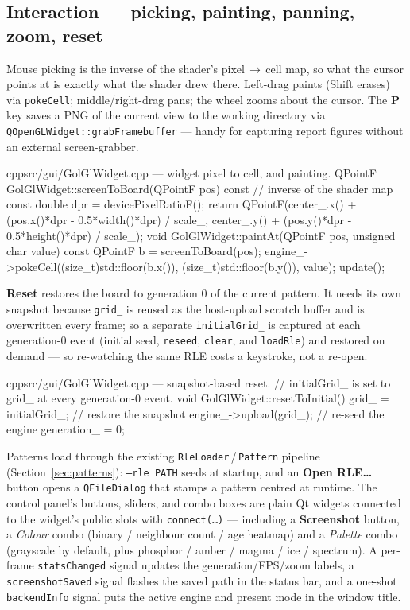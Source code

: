 \documentclass[
	english,
	letterpaper, oneside
]{article}
\begin{document}
\subsection{Interaction --- picking, painting, panning, zoom, reset}
\label{sec:gui-input}

Mouse picking is the inverse of the shader's pixel\,$\rightarrow$\,cell map, so
what the cursor points at is exactly what the shader drew there. Left-drag paints
(Shift erases) via \texttt{pokeCell}; middle/right-drag pans; the wheel zooms about
the cursor. The \textbf{P} key saves a PNG of the current view to the working
directory via \texttt{QOpenGLWidget::grabFramebuffer} --- handy for capturing report
figures without an external screen-grabber.

\begin{sourcecode}{cpp}{src/gui/GolGlWidget.cpp --- widget pixel to cell, and painting.}
QPointF GolGlWidget::screenToBoard(QPointF pos) const {       // inverse of the shader map
  const double dpr = devicePixelRatioF();
  return QPointF(center_.x() + (pos.x()*dpr - 0.5*width()*dpr)  / scale_,
                 center_.y() + (pos.y()*dpr - 0.5*height()*dpr) / scale_);
}
void GolGlWidget::paintAt(QPointF pos, unsigned char value) {
  const QPointF b = screenToBoard(pos);
  engine_->pokeCell((size_t)std::floor(b.x()), (size_t)std::floor(b.y()), value);
  update();
}
\end{sourcecode}

\textbf{Reset} restores the board to generation 0 of the current pattern. It needs
its own snapshot because \texttt{grid\_} is reused as the host-upload scratch
buffer and is overwritten every frame; so a separate \texttt{initialGrid\_} is
captured at each generation-0 event (initial seed, \texttt{reseed}, \texttt{clear},
and \texttt{loadRle}) and restored on demand --- so re-watching the same RLE costs
a keystroke, not a re-open.

\begin{sourcecode}{cpp}{src/gui/GolGlWidget.cpp --- snapshot-based reset.}
// initialGrid_ is set to grid_ at every generation-0 event.
void GolGlWidget::resetToInitial() {
  grid_ = initialGrid_;      // restore the snapshot
  engine_->upload(grid_);    // re-seed the engine
  generation_ = 0;
}
\end{sourcecode}

Patterns load through the existing \texttt{RleLoader}\,/\,\texttt{Pattern} pipeline
(Section~\ref{sec:patterns}): \texttt{--rle PATH} seeds at startup, and an
\textbf{Open RLE\dots} button opens a \texttt{QFileDialog} that stamps a pattern
centred at runtime. The control panel's buttons, sliders, and combo boxes are plain
Qt widgets connected to the widget's public slots with \texttt{connect(\dots)} ---
including a \textbf{Screenshot} button, a \emph{Colour} combo (binary / neighbour
count / age heatmap) and a \emph{Palette} combo (grayscale by default, plus phosphor /
amber / magma / ice / spectrum). A per-frame \texttt{statsChanged} signal updates the generation/FPS/zoom
labels, a \texttt{screenshotSaved} signal flashes the saved path in the status bar,
and a one-shot \texttt{backendInfo} signal puts the active engine and present mode in
the window title.
\end{document}
